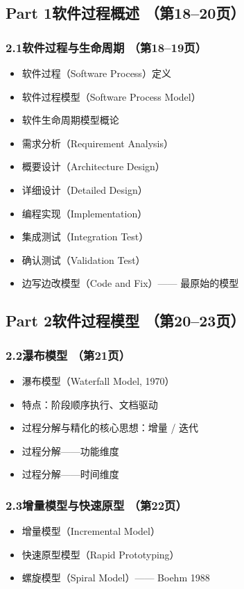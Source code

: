 \documentclass[12pt,a4paper]{ctexart}
\begin{document}
\subsection{Part 1\quad 软件过程概述 \hfill（第18--20页）}

\subsubsection{2.1\quad 软件过程与生命周期 \hfill（第18--19页）}
\begin{itemize}
    \item 软件过程（Software Process）定义
    \item 软件过程模型（Software Process Model）
    \item 软件生命周期模型概论
    \item 需求分析（Requirement Analysis）
    \item 概要设计（Architecture Design）
    \item 详细设计（Detailed Design）
    \item 编程实现（Implementation）
    \item 集成测试（Integration Test）
    \item 确认测试（Validation Test）
    \item 边写边改模型（Code and Fix）—— 最原始的模型
\end{itemize}

\subsection{Part 2\quad 软件过程模型 \hfill（第20--23页）}

\subsubsection{2.2\quad 瀑布模型 \hfill（第21页）}
\begin{itemize}
    \item 瀑布模型（Waterfall Model, 1970）
    \item 特点：阶段顺序执行、文档驱动
    \item 过程分解与精化的核心思想：增量 / 迭代
    \item 过程分解——功能维度
    \item 过程分解——时间维度
\end{itemize}

\subsubsection{2.3\quad 增量模型与快速原型 \hfill（第22页）}
\begin{itemize}
    \item 增量模型（Incremental Model）
    \item 快速原型模型（Rapid Prototyping）
    \item 螺旋模型（Spiral Model）—— Boehm 1988
\end{itemize}
\end{document}
